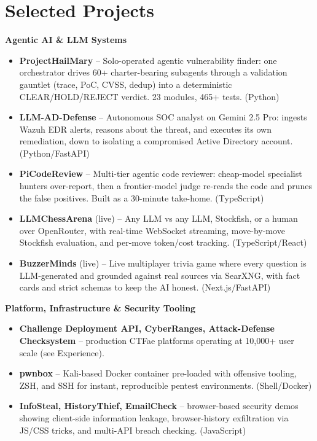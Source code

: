 \documentclass[10pt,a4paper]{article}
\begin{document}
\section{Selected Projects}

{\small\textbf{Agentic AI \& LLM Systems}}
\begin{itemize}
    \item {\small \textbf{ProjectHailMary} -- Solo-operated agentic vulnerability finder: one orchestrator drives 60+ charter-bearing subagents through a validation gauntlet (trace, PoC, CVSS, dedup) into a deterministic CLEAR/HOLD/REJECT verdict. 23 modules, 465+ tests. (Python)}
    \item {\small \textbf{LLM-AD-Defense} -- Autonomous SOC analyst on Gemini 2.5 Pro: ingests Wazuh EDR alerts, reasons about the threat, and executes its own remediation, down to isolating a compromised Active Directory account. (Python/FastAPI)}
    \item {\small \textbf{PiCodeReview} -- Multi-tier agentic code reviewer: cheap-model specialist hunters over-report, then a frontier-model judge re-reads the code and prunes the false positives. Built as a 30-minute take-home. (TypeScript)}
    \item {\small \textbf{LLMChessArena} (live) -- Any LLM vs any LLM, Stockfish, or a human over OpenRouter, with real-time WebSocket streaming, move-by-move Stockfish evaluation, and per-move token/cost tracking. (TypeScript/React)}
    \item {\small \textbf{BuzzerMinds} (live) -- Live multiplayer trivia game where every question is LLM-generated and grounded against real sources via SearXNG, with fact cards and strict schemas to keep the AI honest. (Next.js/FastAPI)}
\end{itemize}

\vspace{2pt}
{\small\textbf{Platform, Infrastructure \& Security Tooling}}
\begin{itemize}
    \item {\small \textbf{Challenge Deployment API, CyberRanges, Attack-Defense Checksystem} -- production CTFae platforms operating at 10,000+ user scale (see Experience).}
    \item {\small \textbf{pwnbox} -- Kali-based Docker container pre-loaded with offensive tooling, ZSH, and SSH for instant, reproducible pentest environments. (Shell/Docker)}
    \item {\small \textbf{InfoSteal, HistoryThief, EmailCheck} -- browser-based security demos showing client-side information leakage, browser-history exfiltration via JS/CSS tricks, and multi-API breach checking. (JavaScript)}
\end{itemize}
\end{document}
